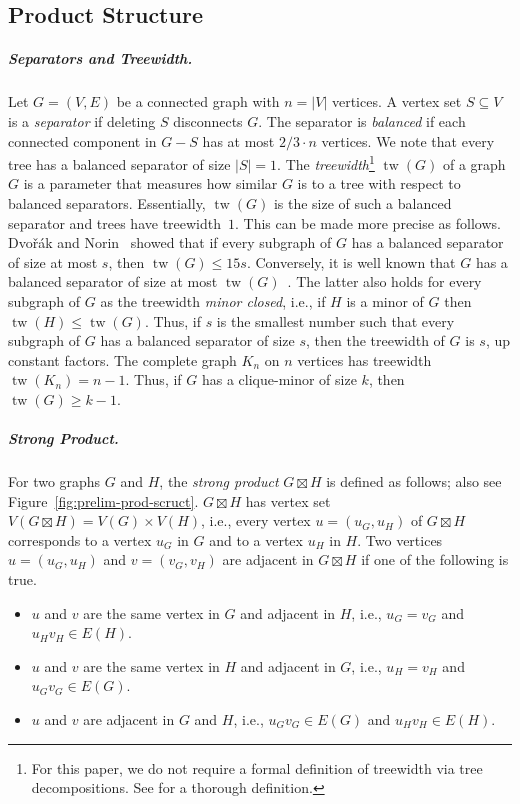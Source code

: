 \documentclass[11pt]{article}
\DeclareMathOperator{\tw}{tw}
\begin{document}
\subsection{Product Structure}
%
\subparagraph{Separators and Treewidth.}
%
Let $G = (V, E)$ be a connected graph with $n = |V|$ vertices.
A vertex set $S \subseteq V$ is a \emph{separator} if deleting $S$ disconnects $G$.
The separator is \emph{balanced} if each connected component in $G - S$ has at most $2/3 \cdot n$ vertices.
We note that every tree has a balanced separator of size $|S| = 1$.
The \emph{treewidth}\footnote{For this paper, we do not require a formal definition of treewidth via tree decompositions. See \cite[Section~7]{cygan_treewidth_2015} for a thorough definition.} $\tw(G)$ of a graph $G$ is a parameter that measures how similar $G$ is to a tree with respect to balanced separators.
Essentially, $\tw(G)$ is the size of such a balanced separator and trees have treewidth~$1$.
This can be made more precise as follows.
Dvořák and Norin~\cite{Treew_Graph_Balan_Separ-DvoraNorin19} showed that if every subgraph of $G$ has a balanced separator of size at most $s$, then $\tw(G) \le 15s$.
Conversely, it is well known that $G$ has a balanced separator of size at most $\tw(G)$~\cite[Lemma~7.20]{cygan_treewidth_2015}.
The latter also holds for every subgraph of $G$ as the treewidth \emph{minor closed}, i.e., if $H$ is a minor of $G$ then $\tw(H) \le \tw(G)$.
Thus, if $s$ is the smallest number such that every subgraph of $G$ has a balanced separator of size $s$, then the treewidth of $G$ is $s$, up constant factors.
%
The complete graph $K_n$ on $n$ vertices has treewidth $\tw(K_n) = n - 1$.
Thus, if $G$ has a clique-minor of size $k$, then $\tw(G) \ge k - 1$.
%
\subparagraph{Strong Product.}
%
For two graphs $G$ and $H$, the \emph{strong product} $G \boxtimes H$ is defined as follows; also see Figure~\ref{fig:prelim-prod-scruct}.
$ G \boxtimes H $ has vertex set $V(G \boxtimes H) = V(G) \times V(H)$, i.e., every vertex $u = (u_G, u_H)$ of $G \boxtimes H$ corresponds to a vertex $u_G$ in $G$ and to a vertex $u_H$ in $H$.
Two vertices $u = (u_G, u_H)$ and $v = (v_G, v_H)$ are adjacent in $G \boxtimes H$ if one of the following is true.
%
\begin{itemize}
  \item $u$ and $v$ are the same vertex in $G$ and adjacent in $H$, i.e., $u_G = v_G$ and $u_Hv_H \in E(H)$.
  \item $u$ and $v$ are the same vertex in $H$ and adjacent in $G$, i.e., $u_H = v_H$ and $u_Gv_G \in E(G)$.
  \item $u$ and $v$ are adjacent in $G$ and $H$, i.e., $u_Gv_G \in E(G)$ and $u_Hv_H \in E(H)$.
\end{itemize}
\end{document}
